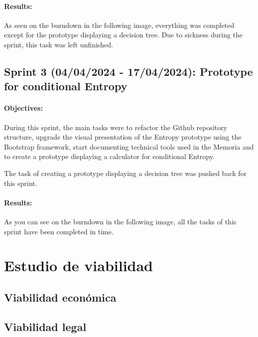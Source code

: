 \paragraph{Results:}
As seen on the burndown in the following image, everything was completed except for the prototype displaying a decision tree. Due to sickness during the sprint, this task was left unfinished.

\subsection{Sprint 3 (04/04/2024 - 17/04/2024): Prototype for conditional Entropy}
\paragraph{Objectives:}
During this sprint, the main tasks were to refactor the Github repository structure, upgrade the visual presentation of the Entropy prototype using the Bootstrap framework, start documenting technical tools used in the Memoria and to create a prototype displaying a calculator for conditional Entropy.

The task of creating a prototype displaying a decision tree was pushed back for this sprint.

\paragraph{Results:}
As you can see on the burndown in the following image, all the tasks of this sprint have been completed in time.


\section{Estudio de viabilidad}

\subsection{Viabilidad económica}

\subsection{Viabilidad legal}
